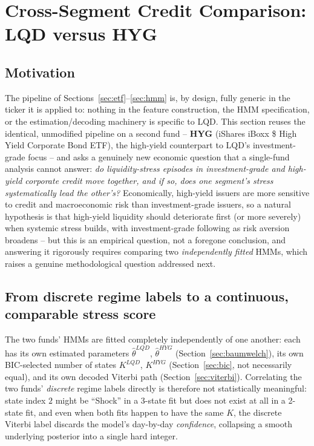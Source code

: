 \documentclass[11pt]{article}
\theoremstyle{definition}
\theoremstyle{remark}
\begin{document}
\section{Cross-Segment Credit Comparison: LQD versus HYG}
\label{sec:crossetf}

\subsection{Motivation}

The pipeline of Sections~\ref{sec:etf}--\ref{sec:hmm} is, by design, fully generic in the ticker it is applied to: nothing in the feature construction, the HMM specification, or the estimation/decoding machinery is specific to LQD. This section reuses the identical, unmodified pipeline on a second fund -- \textbf{HYG} (iShares iBoxx \$ High Yield Corporate Bond ETF), the high-yield counterpart to LQD's investment-grade focus -- and asks a genuinely new economic question that a single-fund analysis cannot answer: \emph{do liquidity-stress episodes in investment-grade and high-yield corporate credit move together, and if so, does one segment's stress systematically lead the other's?} Economically, high-yield issuers are more sensitive to credit and macroeconomic risk than investment-grade issuers, so a natural hypothesis is that high-yield liquidity should deteriorate first (or more severely) when systemic stress builds, with investment-grade following as risk aversion broadens -- but this is an empirical question, not a foregone conclusion, and answering it rigorously requires comparing two \emph{independently fitted} HMMs, which raises a genuine methodological question addressed next.

\subsection{From discrete regime labels to a continuous, comparable stress score}
\label{sec:stress-score}

The two funds' HMMs are fitted completely independently of one another: each has its own estimated parameters $\widehat\theta^{LQD}$, $\widehat\theta^{HYG}$ (Section~\ref{sec:baumwelch}), its own BIC-selected number of states $K^{LQD}$, $K^{HYG}$ (Section~\ref{sec:bic}, not necessarily equal), and its own decoded Viterbi path (Section~\ref{sec:viterbi}). Correlating the two funds' \emph{discrete} regime labels directly is therefore not statistically meaningful: state index $2$ might be ``Shock'' in a 3-state fit but does not exist at all in a 2-state fit, and even when both fits happen to have the same $K$, the discrete Viterbi label discards the model's day-by-day \emph{confidence}, collapsing a smooth underlying posterior into a single hard integer.
\end{document}
